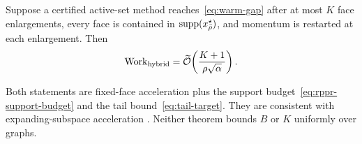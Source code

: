 \begin{theorem}
\label{thm:controlled-faces}
Suppose a certified active-set method reaches~\eqref{eq:warm-gap} after at
most $K$ face enlargements, every face is contained in
$\operatorname{supp}(x_{\bar\rho}^\star)$, and momentum is restarted at each enlargement.
Then
\begin{equation}
 \operatorname{Work}_{\mathrm{hybrid}}
 =\widetilde{\mathcal{O}}\!\left(\frac{K+1}{\rho\sqrt\alpha}\right).
 \label{eq:face-phase-work}
\end{equation}
\end{theorem}

Both statements are fixed-face acceleration plus the support
budget~\eqref{eq:rppr-support-budget} and the tail
bound~\eqref{eq:tail-target}.  They are consistent with expanding-subspace
acceleration \citep{martinezrubio2023accelerated}.  Neither theorem bounds
$B$ or $K$ uniformly over graphs.
